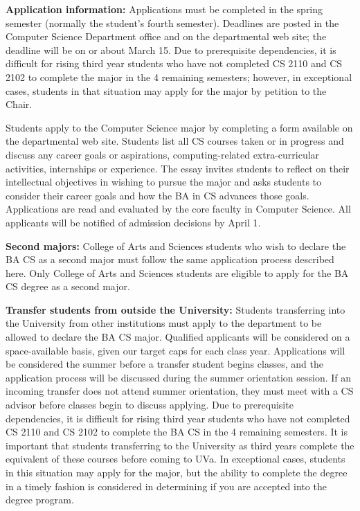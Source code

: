 {\bf Application information:} Applications must be completed in the
spring semester (normally the student's fourth semester).  Deadlines
are posted in the Computer Science Department office and on the
departmental web site; the deadline will be on or about March 15.  Due
to prerequisite dependencies, it is difficult for rising third year
students who have not completed CS 2110 and CS 2102 to complete the
major in the 4 remaining semesters; however, in exceptional cases,
students in that situation may apply for the major by petition to the
Chair.

Students apply to the Computer Science major by completing a form
available on the departmental
web site. Students
list all CS courses taken or in progress and discuss any career goals
or aspirations, computing-related extra-curricular activities,
internships or experience. The essay invites students to reflect on
their intellectual objectives in wishing to pursue the major and asks
students to consider their career goals and how the BA in CS advances
those goals. Applications are read and evaluated by the core faculty
in Computer Science. All applicants will be notified of admission
decisions by April 1.

{\bf Second majors:} College of Arts and Sciences students who wish to
declare the BA CS as a second major must follow the same application
process described here. Only College of Arts and Sciences students are
eligible to apply for the BA CS degree as a second major.

{\bf Transfer students from outside the University:} Students
transferring into the University from other institutions must apply to
the department to be allowed to declare the BA CS major. Qualified
applicants will be considered on a space-available basis, given our
target caps for each class year. Applications will be considered the
summer before a transfer student begins classes, and the application
process will be discussed during the summer orientation session. If an
incoming transfer does not attend summer orientation, they must meet
with a CS advisor before classes begin to discuss applying.  Due to
prerequisite dependencies, it is difficult for rising third year
students who have not completed CS 2110 and CS 2102 to complete the
BA CS in the 4 remaining semesters. It is important that students
transferring to the University as third years complete the equivalent
of these courses before coming to UVa. In exceptional cases, students
in this situation may apply for the major, but the ability to complete
the degree in a timely fashion is considered in determining if
you are accepted into the degree program.




